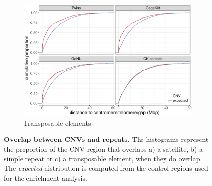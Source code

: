 \begin{figure}[htp]
  \begin{subfigure}{.48\textwidth}
    \includegraphics[width=\textwidth,page=9]{figures/PopSV-repeatEnr.pdf}
    \caption{Transposable elements}
  \end{subfigure}
  \caption[Overlap between CNVs and repeats.]{{\bf Overlap between CNVs and repeats.} {\small The histograms represent the proportion of the CNV region that overlaps a) a satellite, b) a simple repeat or c) a transposable element, when they do overlap. The {\it expected} distribution is computed from the control regions used for the enrichment analysis.}}
  \label{fig:repeatOl}
\end{figure}


